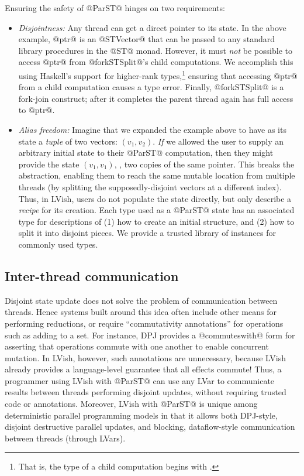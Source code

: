 Ensuring the safety of @ParST@ hinges on two requirements:

\begin{itemize}
\item \emph{Disjointness:} Any thread can get a direct pointer to its
  state.  In the above example, @ptr@ is an @STVector@ that can be
  passed to any standard library procedures in the @ST@ monad.
  However, it must \emph{not} be possible to access @ptr@ from
  @forkSTSplit@'s child computations.  We accomplish this using
  Haskell's support for higher-rank types,\footnote{That is, the type
    of a child computation begins with .} ensuring that accessing @ptr@ from a child
  computation causes a type error.  Finally, @forkSTSplit@ is a
  fork-join construct; after it completes the parent thread again has
  full access to @ptr@.

\item \emph{Alias freedom:} Imagine that we expanded the example above
  to have as its state a \emph{tuple} of two vectors: $(v_1,v_2)$.
  \emph{If} we allowed the user to supply an arbitrary initial state
  to their @ParST@ computation, then they might provide the state
  $(v_1, v_1)$, \ie, two copies of the same pointer.  This breaks the
  abstraction, enabling them to reach the same mutable location from
  multiple threads (by splitting the supposedly-disjoint vectors at a
  different index).  Thus, in LVish, users do not populate the state
  directly, but only describe a \emph{recipe} for its creation.  Each
  type used as a @ParST@ state has an associated type for descriptions
  of (1) how to create an initial structure, and (2) how to split it
  into disjoint pieces.  We provide a trusted library of instances for
  commonly used types.
\end{itemize}

\subsection{Inter-thread communication}

Disjoint state update does not solve the problem of communication
between threads.  Hence systems built around this idea often include
other means for performing reductions, or require ``commutativity
annotations'' for operations such as adding to a set.  For instance,
DPJ provides a @commuteswith@ form for asserting that operations
commute with one another to enable concurrent mutation.  In LVish,
however, such annotations are unnecessary, because LVish already
provides a language-level guarantee that all effects commute!  Thus, a
programmer using LVish with @ParST@ can use any LVar to communicate
results between threads performing disjoint updates, without requiring
trusted code or annotations.  Moreover, LVish with @ParST@ is unique
among deterministic parallel programming models in that it allows both
DPJ-style, disjoint destructive parallel updates, and blocking,
dataflow-style communication between threads (through LVars).
